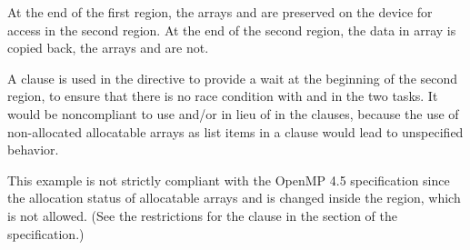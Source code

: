 At the end of the first  region, the arrays  and  are preserved on the device 
for access in the second  region. At the end of the second  region, the data 
in array  is copied back, the arrays  and  are not.

A  clause is used in the  directive to provide a wait at the beginning of the second 
 region, to ensure that there is no race condition with  and  in the two tasks.
It would be noncompliant to use  and/or  in lieu of  in the  clauses, 
because the use of non-allocated allocatable arrays as list items in a  clause would 
lead to unspecified behavior. 

\noteheader{--} This example is not strictly compliant with the OpenMP 4.5 specification since the allocation status
of allocatable arrays  and  is changed inside the  region, which is not allowed.
(See the restrictions for the  clause in the  
section of the specification.)

